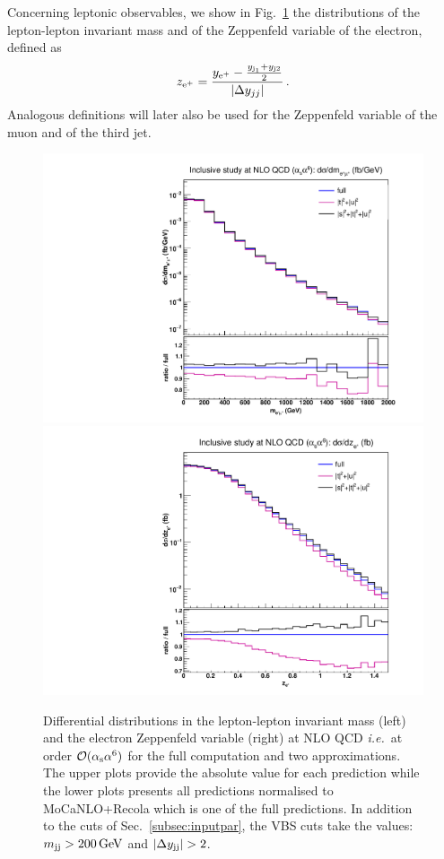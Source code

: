 Concerning leptonic observables, we show in Fig.~\ref{fig:mjjdyjj_1d_3} the distributions of the lepton-lepton invariant mass and of the Zeppenfeld variable of the electron, defined as
%
\begin{equation}
  z_{\text{e}^+} = \frac{y_{\text{e}^+}-\frac{y_{\text{j}_1}+y_{\text{j}2}}2}{|\Delta y_{jj}|} \,.
  \label{eq:Zeppenfeld}
\end{equation}
%
Analogous definitions will later also be used for the Zeppenfeld variable of the muon and of the third jet.
%
\begin{figure}[hbt]
\centering
{\includegraphics[scale=0.35]{figures/scanfigures/mll_nlo.pdf}}
{\includegraphics[scale=0.35]{figures/scanfigures/zel_nlo.pdf}}
\caption{Differential distributions in the lepton-lepton invariant mass (left) and the electron Zeppenfeld variable (right) at NLO QCD \emph{i.e.}\ at order $\mathcal{O}(\alpha_\text{s}\alpha^6)$ for the full computation and two approximations.
The upper plots provide the absolute value for each prediction while the lower plots presents all predictions normalised to {\sc MoCaNLO}+{\sc Recola} which is one of the full predictions.
In addition to the cuts of Sec.~\ref{subsec:inputpar}, the VBS cuts take the values: $m_{\text{j}\text{j}}>200 \,\text{GeV}$ and $|\Delta y_{\Pj\Pj}|>2$.} 
\label{fig:mjjdyjj_1d_3}
\end{figure}
